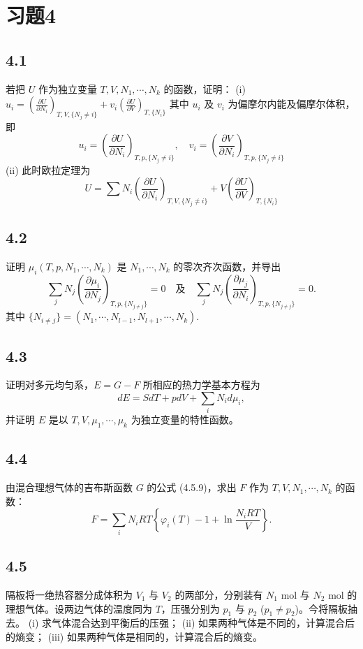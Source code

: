 \section{习题4}

\newpage
\subsection{4.1}
若把 $U$ 作为独立变量 $T, V, N_1, \cdots, N_k$ 的函数，证明：
(i) $u_i = \left( \frac{\partial U}{\partial N_i} \right)_{T,V,\{N_j\ne i\}} + v_i \left( \frac{\partial U}{\partial V} \right)_{T,\{N_i\}}$
其中 $u_i$ 及 $v_i$ 为偏摩尔内能及偏摩尔体积，即
$$u_i = \left( \frac{\partial U}{\partial N_i} \right)_{T,p,\{N_j\ne i\}}, \quad v_i = \left( \frac{\partial V}{\partial N_i} \right)_{T,p,\{N_j\ne i\}}$$
(ii) 此时欧拉定理为
$$U = \sum N_i \left( \frac{\partial U}{\partial N_i} \right)_{T,V,\{N_j\ne i\}} + V \left( \frac{\partial U}{\partial V} \right)_{T,\{N_i\}}$$

\newpage
\subsection{4.2}
证明 $\mu_i(T,p,N_1,\cdots,N_k)$ 是 $N_1,\cdots,N_k$ 的零次齐次函数，并导出
$$ \sum_j N_j \left( \frac{\partial \mu_i}{\partial N_j} \right)_{T,p,\{N_{j\neq j}\}} = 0 \quad 及 \quad \sum_j N_j \left( \frac{\partial \mu_j}{\partial N_i} \right)_{T,p,\{N_{j\neq j}\}} = 0. $$
其中 $\{N_{i\neq j}\} = (N_1,\cdots,N_{l-1},N_{l+1},\cdots,N_k)$.

\newpage
\subsection{4.3}
证明对多元均匀系，$E = G - F$ 所相应的热力学基本方程为
$$dE = S dT + p dV + \sum_i N_i d\mu_i,$$
并证明 $E$ 是以 $T, V, \mu_1, \cdots, \mu_k$ 为独立变量的特性函数。

\newpage
\subsection{4.4}
由混合理想气体的吉布斯函数 $G$ 的公式 (4.5.9)，求出 $F$ 作为 $T, V, N_1, \cdots, N_k$ 的函数：
$$F = \sum_i N_i RT \left\{ \varphi_i(T) - 1 + \ln \frac{N_i RT}{V} \right\}.$$

\newpage
\subsection{4.5}
隔板将一绝热容器分成体积为 $V_1$ 与 $V_2$ 的两部分，分别装有 $N_1$ mol 与 $N_2$ mol 的理想气体。设两边气体的温度同为 $T$，压强分别为 $p_1$ 与 $p_2$ ($p_1 \neq p_2$)。今将隔板抽去。
(i) 求气体混合达到平衡后的压强；
(ii) 如果两种气体是不同的，计算混合后的熵变；
(iii) 如果两种气体是相同的，计算混合后的熵变。

